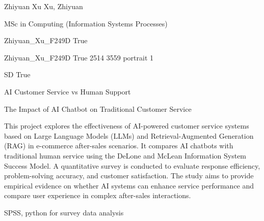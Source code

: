 \documentclass[twoside]{report}
\begin{document}
\begingroup{}\relax



\def\Key{Zhiyuan_Xu_F249D}

{Zhiyuan Xu}
{Xu, Zhiyuan}

{MSc in Computing (Information Systems Processes)}

{Zhiyuan_Xu_F249D}
{True}

{Zhiyuan_Xu_F249D}
{True}
{2514}
{3559}
{portrait}
{1}

{SD}
{True}

{AI Customer Service vs Human Support}

{The Impact of AI Chatbot on Traditional Customer Service}

{This project explores the effectiveness of AI-powered customer service systems based on Large Language Models (LLMs) and Retrieval-Augmented Generation (RAG) in e-commerce after-sales scenarios. It compares AI chatbots with traditional human service using the DeLone and McLean Information System Success Model. A quantitative survey is conducted to evaluate response efficiency, problem-solving accuracy, and customer satisfaction. The study aims to provide empirical evidence on whether AI systems can enhance service performance and compare user experience in complex after-sales interactions.}

{SPSS, python for survey data analysis}
\end{document}
